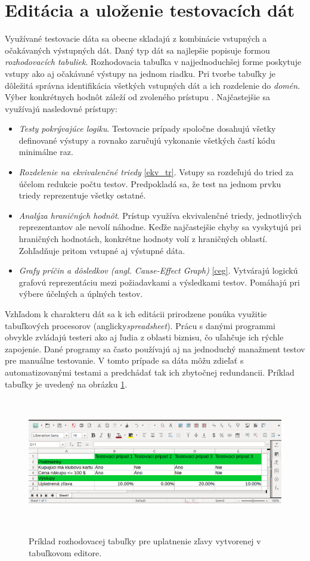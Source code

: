 \section{Editácia a uloženie testovacích dát}
Využívané testovacie dáta sa obecne skladajú z kombinácie vstupných a očakávaných výstupných dát. Daný typ dát sa najlepšie popisuje formou {\it rozhodovacích tabuliek}. Rozhodovacia tabuľka v najjednoduchšej forme poskytuje vstupy ako aj očakávané výstupy na jednom riadku. Pri tvorbe tabuľky je dôležitá správna identifikácia všetkých vstupných dát a ich rozdelenie do {\it domén}. Výber konkrétnych hodnôt záleží od zvoleného prístupu \cite{Ast}. Najčastejšie sa využívajú nasledovné prístupy:
\begin{itemize}
	\item{ \textit{Testy pokrývajúce logiku}. Testovacie prípady spoločne dosahujú všetky definované výstupy a rovnako zaručujú vykonanie všetkých častí kódu minimálne raz.}
	\item{ \textit{Rozdelenie na ekvivalenčné triedy} \ref{ekv_tr}. 
		Vstupy sa rozdeľujú  do tried za účelom redukcie počtu testov. Predpokladá sa, že test na jednom prvku triedy reprezentuje všetky ostatné. }
	\item{ \textit{Analýza hraničných hodnôt}. 
		Prístup využíva ekvivalenčné triedy, jednotlivých reprezentantov ale nevolí náhodne. Keďže najčastejšie chyby sa vyskytujú pri hraničných hodnotách, konkrétne hodnoty volí z hraničných oblastí. Zohľadňuje pritom vstupné aj výstupné dáta.}
	\item{ \textit{Grafy príčin a dôsledkov (angl. Cause-Effect Graph)} \ref{ceg}. 
		Vytvárajú logickú grafovú reprezentáciu mezi požiadavkami a výsledkami testov. Pomáhajú pri výbere účelných a úplných testov.}
\end{itemize}


Vzhľadom k charakteru dát sa k ich editácii prirodzene ponúka využitie tabuľkových procesorov (anglicky{\it spreadsheet}). Prácu s danými programmi obvykle zvládajú testeri ako aj ľudia z oblasti biznisu, čo uľahčuje ich rýchle zapojenie. Dané programy sa často používajú aj na jednoduchý manažment testov pre manuálne testovanie. V tomto prípade sa dáta môžu zdieľať s automatizovanými testami a predchádať tak ich zbytočnej redundancii. Príklad tabuľky je uvedený na obrázku \ref{Domtab_img}. 
\begin{figure}[h]\centering
	\centering
	\includegraphics[width=6.0in,height=2.2in]{obrazky-figures/decision_table.png}\\[1pt]
	\caption{Príklad rozhodovacej tabuľky pre uplatnenie zľavy vytvorenej v tabuľkovom editore.}
	\label{Domtab_img}
\end{figure}

